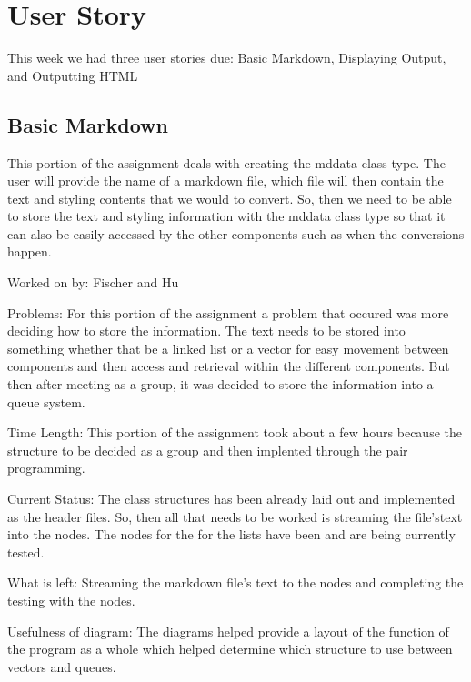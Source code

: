\section{User Story}
This week we had three user stories due: Basic Markdown, Displaying Output, and Outputting HTML

\subsection{Basic Markdown}
This portion of the assignment deals with creating the mddata class type. The user will provide the name of a markdown file, which file will then contain the text and styling contents that we would to convert. So, then we need to be able to store the text and styling information with the mddata class type so that it can also be easily accessed by the other components such as when the conversions happen. \newline 

\noindent Worked on by: Fischer and Hu \newline

\noindent Problems: For this portion of the assignment a problem that occured was more deciding how to store the information. The text needs to be stored into something whether that be a linked list or a vector for easy movement between components and then access and retrieval within the different components. But then after meeting as a group, it was decided to store the information into a queue system. \newline

\noindent Time Length: This portion of the assignment took about a few hours because the structure to be decided as a group and then implented through the pair programming. \newline

\noindent Current Status: The class structures has been already laid out and implemented as the header files. So, then all that needs to be worked is streaming the file'stext into the nodes. The nodes for the for the lists have been and are being currently tested. \newline

\noindent What is left: Streaming the markdown file's text to the nodes and completing the testing with the nodes. \newline

\noindent Usefulness of diagram: The diagrams helped provide a layout of the function of the program as a whole which helped determine which structure to use between vectors and queues. \newline


